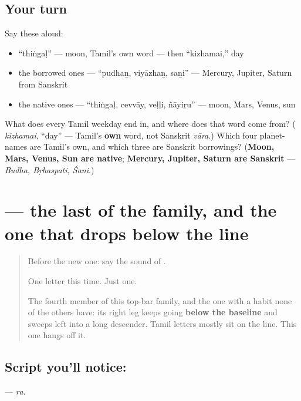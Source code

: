 \subsection*{Your turn}
Say these aloud:

\begin{itemize}
\raggedright
  \item \textquotedblleft{}thiṅgaḷ\textquotedblright{} — moon, Tamil's own word — then \textquotedblleft{}kizhamai,\textquotedblright{} day
  \item the borrowed ones — \textquotedblleft{}pudhaṉ, viyāzhaṉ, saṉi\textquotedblright{} — Mercury, Jupiter, Saturn from Sanskrit
  \item the native ones — \textquotedblleft{}thiṅgaḷ, cevvāy, veḷḷi, ñāyiṟu\textquotedblright{} — moon, Mars, Venus, sun
\end{itemize}

\begin{tcolorbox}[breakable,colback=teal!4,colframe=teal!35!black,title={Before you move on}]
What does every Tamil weekday end in, and where does that word come from? (\textbf{} \emph{kizhamai}, \textquotedblleft{}day\textquotedblright{} — Tamil's \textbf{own} word, not Sanskrit \emph{vāra}.) Which four planet-names are Tamil's own, and which three are Sanskrit borrowings? (\textbf{Moon, Mars, Venus, Sun are native}; \textbf{Mercury, Jupiter, Saturn are Sanskrit} — \emph{Budha, Bṛhaspati, Śani}.)
\end{tcolorbox}
\section[\texorpdfstring{\ta{ற} (ṟa)}{ற (ṟa)}]{ — the last of the family, and the one that drops below the line}

\label{lesson:TA-S05-rra}



\begin{quote}
Before the new one: say the sound of \textbf{}.

One letter this time. Just one.

The fourth member of this top-bar family, and the one with a habit none of the others have: its right leg keeps going \textbf{below the baseline} and sweeps left into a long descender. Tamil letters mostly sit on the line. This one hangs off it.
\end{quote}

\subsection*{Script you'll notice: }
\textbf{} — \emph{ṟa}.

